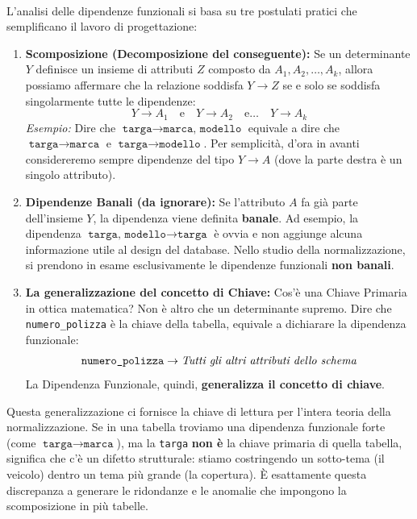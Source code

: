 \paragraph{}

L'analisi delle dipendenze funzionali si basa su tre postulati pratici che semplificano il lavoro di progettazione:

\begin{enumerate}
    \item \textbf{Scomposizione (Decomposizione del conseguente):}
    Se un determinante $Y$ definisce un insieme di attributi $Z$ composto da $A_1, A_2, \dots, A_k$, allora possiamo affermare che la relazione soddisfa $Y \rightarrow Z$ se e solo se soddisfa singolarmente tutte le dipendenze: 
    $$ Y \rightarrow A_1 \quad \text{e} \quad Y \rightarrow A_2 \quad \text{e} \dots \quad Y \rightarrow A_k $$
    \textit{Esempio:} Dire che $\texttt{targa} \rightarrow \texttt{marca, modello}$ equivale a dire che $\texttt{targa} \rightarrow \texttt{marca}$ e $\texttt{targa} \rightarrow \texttt{modello}$. Per semplicità, d'ora in avanti considereremo sempre dipendenze del tipo $Y \rightarrow A$ (dove la parte destra è un singolo attributo).

    \item \textbf{Dipendenze Banali (da ignorare):}
    Se l'attributo $A$ fa già parte dell'insieme $Y$, la dipendenza viene definita \textbf{banale}. Ad esempio, la dipendenza $\texttt{targa, modello} \rightarrow \texttt{targa}$ è ovvia e non aggiunge alcuna informazione utile al design del database. Nello studio della normalizzazione, si prendono in esame esclusivamente le dipendenze funzionali \textbf{non banali}.

    \item \textbf{La generalizzazione del concetto di Chiave:}
    Cos'è una Chiave Primaria in ottica matematica? Non è altro che un determinante supremo. Dire che \texttt{numero\_polizza} è la chiave della tabella, equivale a dichiarare la dipendenza funzionale:
    $$ \texttt{numero\_polizza} \rightarrow \text{\textit{Tutti gli altri attributi dello schema}} $$
    La Dipendenza Funzionale, quindi, \textbf{generalizza il concetto di chiave}. 
\end{enumerate}

\begin{tip}
Questa generalizzazione ci fornisce la chiave di lettura per l'intera teoria della normalizzazione. Se in una tabella troviamo una dipendenza funzionale forte (come $\texttt{targa} \rightarrow \texttt{marca}$), ma la \texttt{targa} \textbf{non è} la chiave primaria di quella tabella, significa che c'è un difetto strutturale: stiamo costringendo un sotto-tema (il veicolo) dentro un tema più grande (la copertura). È esattamente questa discrepanza a generare le ridondanze e le anomalie che impongono la scomposizione in più tabelle.
\end{tip}

